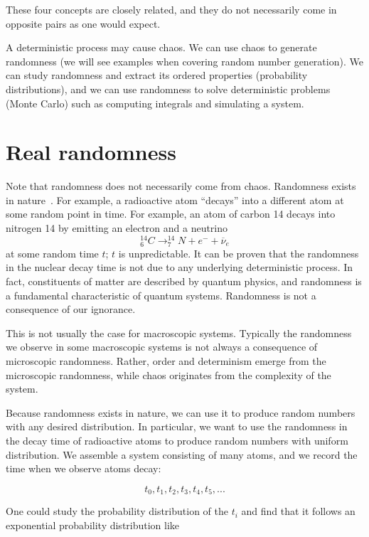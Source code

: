 \documentclass[justified, sixbynine]{tufte-book}
\theoremstyle{plain}%
\newtheorem * {corollary}{Corollary}
\theoremstyle{definition}
\theoremstyle{remark}
\newtheorem * {remark}{Remark}
\newtheorem * {note}{Note}
\begin{document}
\begin{fullwidth}
These four concepts are closely related, and they do not necessarily come in
opposite pairs as one would expect.

A deterministic process may cause chaos. We can use chaos to generate
randomness (we will see examples when covering random number generation). We
can study randomness and extract its ordered properties (probability
distributions), and we can use randomness to solve deterministic problems
(Monte Carlo) such as computing integrals and simulating a system.

\goodbreak\section{Real randomness}

Note that randomness does not necessarily come from chaos.
Randomness exists in nature~\cite{determinism}\cite{decay}.
For example, a radioactive atom ``decays'' into a different atom
at some random point in time. For example, an atom of carbon 14 decays into nitrogen 14 by emitting an electron and a neutrino
\begin{equation}
_6^{14}C\longrightarrow _7^{14}N+e^{-}+\overline{\nu }_e
\end{equation}
at some random time $t$; $t$ is unpredictable. It can be proven that the
randomness in the nuclear decay time is not due to any underlying
deterministic process. In fact, constituents of matter are
described by quantum physics, and randomness is a fundamental characteristic
of quantum systems. Randomness is not a consequence of our ignorance.

This is not usually the case for macroscopic systems. Typically the
randomness we observe in some macroscopic systems is not always a
consequence of microscopic randomness. Rather, order and determinism
emerge from the microscopic randomness, while chaos originates from the complexity of
the system.

Because randomness exists in nature, we can use it to produce random numbers
with any desired distribution. In particular, we want to use the randomness
in the decay time of radioactive atoms to produce random numbers with
uniform distribution. We assemble a system consisting of many
atoms, and we record the time when we observe atoms decay:

\begin{equation}
t_0, t_1, t_2, t_3, t_4, t_5, ...
\end{equation}

One could study the probability distribution of the $t_i$ and find
that it follows an exponential probability distribution like


\end{fullwidth}
\end{document}
